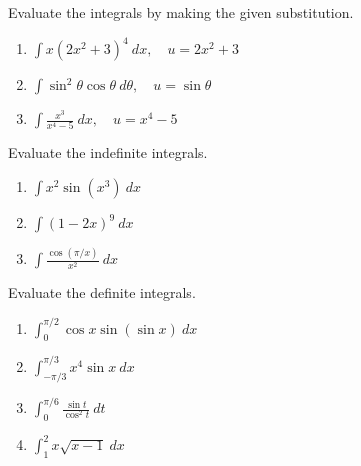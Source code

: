 \documentclass[letterpaper,11pt]{article}
\begin{document}

Evaluate the integrals by making the given substitution.
\begin{enumerate}
    \item $\displaystyle \int x(2x^2 + 3)^4 \ dx, \quad u = 2x^2 + 3$
    \vfill
    \item $\displaystyle \int \sin^2{\theta} \cos{\theta} \ d\theta, \quad u = \sin{\theta}$
    \vfill
    \item $\displaystyle \int \frac{x^3}{x^4-5} \ dx, \quad u = x^4 - 5$
    \vfill
\end{enumerate}
\newpage
Evaluate the indefinite integrals.
\begin{enumerate}[resume]
    \item $\displaystyle \int x^2 \sin(x^3) \ dx$
    \vfill
    \item $\displaystyle \int (1-2x)^9 \ dx$
    \vfill
    \item $\displaystyle \int \frac{\cos(\pi/x)}{x^2} \ dx$
    \vfill
\end{enumerate}
\newpage
Evaluate the definite integrals.
\begin{enumerate}[resume]
    \item $\displaystyle \int_0^{\pi/2} \cos{x} \sin(\sin{x}) \ dx$
    \vfill
    \item $\displaystyle \int_{-\pi/3}^{\pi/3} x^4 \sin{x} \ dx$
    \vfill
    \newpage
    \item $\displaystyle \int_0^{\pi/6} \frac{\sin{t}}{\cos^2{t}} \ dt$
    \vfill
    \item $\displaystyle \int_1^2 x\sqrt{x-1} \ dx$
    \vfill
\end{enumerate}
\end{document}
